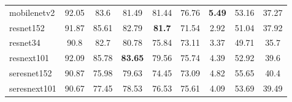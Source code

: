 \begin{table}[H]
{\begin{tabular}{lcccc|cccc}
            \\
            mobilenetv2         & 92.05                                & 83.6
                                & 81.49                                & 81.44
                                & 76.76                                &
            \textbf{5.49}       & 53.16                                & 37.27

            \\
            resnet152           & 91.87                                & 85.61
                                & 82.79                                &
            \textbf{81.7}       & 71.54                                &
            2.92                & 51.04                                & 37.92

            \\
            resnet34            & 90.8                                 & 82.7
                                & 80.78                                & 75.84
                                & 73.11                                & 3.37
                                &
            49.71               & 35.7

            \\
            resnext101          & 92.09                                & 85.78
                                & \textbf{83.65}                       & 79.56
                                & 75.74                                &
            4.39                & 52.92                                & 39.6

            \\
            seresnet152         & 90.87                                & 75.98
                                & 79.63                                & 74.45
                                & 73.09                                & 4.82
                                &
            55.65               & 40.4

            \\
            seresnext101        & 90.67                                & 77.45
                                & 78.53                                & 76.53
                                & 75.61                                & 4.09
                                &
            53.69               & 39.49


\end{tabular}}
\end{table}
